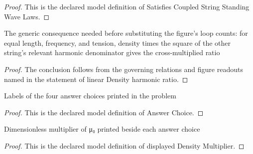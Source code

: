 \begin{proof}
  This is the declared model definition of Satisfies Coupled String Standing Wave Laws.
\end{proof}
\begin{lemma}
  \label{lem:physics:phyx-mini-0182:phyxminiproblems-problemphyxmini0182-lineardensity-harmonic-ratio}
  The generic consequence needed before substituting the figure's loop counts: for equal length, frequency, and tension, density times the square of the other string's relevant harmonic denominator gives the cross-multiplied ratio
\end{lemma}
\begin{proof}
  The conclusion follows from the governing relations and figure readouts named in the statement of linear Density harmonic ratio.
\end{proof}
\begin{definition}
  \label{def:physics:phyx-mini-0182:phyxminiproblems-problemphyxmini0182-answerchoice}
  Labels of the four answer choices printed in the problem
\end{definition}
\begin{proof}
  This is the declared model definition of Answer Choice.
\end{proof}
\begin{definition}
  \label{def:physics:phyx-mini-0182:phyxminiproblems-problemphyxmini0182-displayeddensitymultiplier}
  Dimensionless multiplier of μ₀ printed beside each answer choice
\end{definition}
\begin{proof}
  This is the declared model definition of displayed Density Multiplier.
\end{proof}

